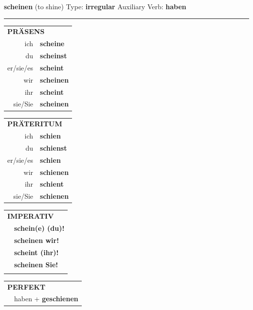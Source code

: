 \documentclass[10pt,a4paper]{revtex4-2}
\begin{document}
\begin{verbbox}
    {\Large \bf scheinen} (to shine) \hfill Type: \textbf{irregular} \hfill Auxiliary Verb: \textbf{haben} 
    
     \vspace{5pt}

    \hrule
    
    \vspace{5pt}

  \begin{tabular}{rl}
     \multicolumn{2}{l}{\textbf{PRÄSENS} }\\
    ich & \textbf{scheine}\\
    du & \textbf{scheinst}\\
    er/sie/es & \textbf{scheint}\\
    wir & \textbf{scheinen}\\
    ihr & \textbf{scheint}\\
    sie/Sie & \textbf{scheinen}\\
  \end{tabular}
  \hfill
     \begin{tabular}{rl}
    \multicolumn{2}{l}{\textbf{PRÄTERITUM} }\\
    ich & \textbf{schien}\\
    du & \textbf{schienst}\\
    er/sie/es & \textbf{schien}\\
    wir & \textbf{schienen}\\
    ihr & \textbf{schient}\\
    sie/Sie & \textbf{schienen}\\
  \end{tabular}
  \hfill
  \begin{tabular}{rl}
     \multicolumn{2}{l}{\textbf{IMPERATIV} }\\
   & \textbf{schein(e) (du)!}\\
   & \textbf{scheinen wir!}\\
   & \textbf{scheint (ihr)!}\\
   & \textbf{scheinen Sie!}\\
   & \vspace{10pt}
  \end{tabular}

    \vspace{10pt}

 \begin{tabular}{rl}
     \multicolumn{2}{l}{\textbf{PERFEKT}}\\
   & haben + \textbf{geschienen}\\
  \end{tabular}
\hfill
   \begin{tabular}{rl}
   

\end{tabular}
\end{verbbox}
\end{document}
